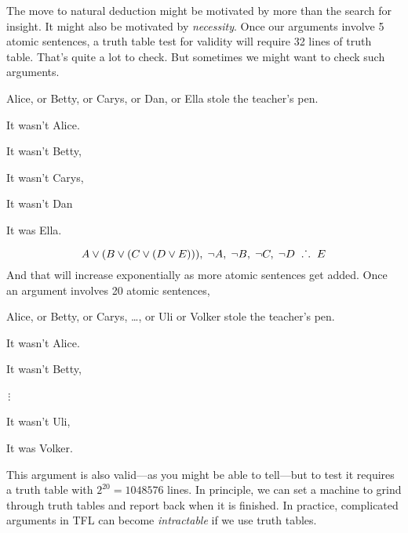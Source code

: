 The move to natural deduction might be motivated by more than the search for insight. It might also be motivated by \emph{necessity}. Once our arguments involve 5 atomic sentences,  a truth table test for validity will require 32 lines of truth table. That's quite a lot to check. But sometimes we might want to check such arguments. 
\begin{center}
\begin{earg}
\item[] Alice, or Betty, or Carys, or Dan, or Ella stole the teacher's pen.
\item[] It wasn't Alice.
\item[] It wasn't Betty,
\item[] It wasn't Carys,
\item[] It wasn't Dan
\item [\therefore] It was Ella. 
\end{earg}
\end{center}
$$A\vee(B\vee (C\vee (D\vee E))),\;\neg A,\;\neg B,\;\neg C,\;\neg D\;\mathrel{\ldotp\dot{}\,\ldotp}\;E$$
And that will increase exponentially as more atomic sentences get added. Once an argument involves 20 atomic sentences, 
\begin{center}
\begin{earg}
\item[] Alice, or Betty, or Carys, \ldots, or Uli or Volker stole the teacher's pen.
\item[] It wasn't Alice.
\item[] It wasn't Betty,
\item[]\,$\vdots$
\item [] It wasn't Uli,
\item [\therefore] It was Volker. 
\end{earg}
\end{center}
This argument is also valid---as you might be able to tell---but to test it requires a truth table with $2^{20} = 1048576$ lines. In principle, we can set a machine to grind through truth tables and report back when it is finished. In practice, complicated arguments in TFL can become \emph{intractable} if we use truth tables.


